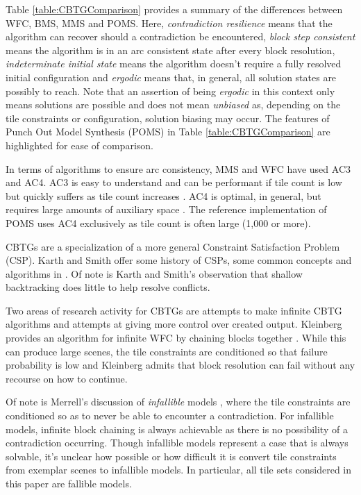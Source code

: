 Table \ref{table:CBTGComparison} provides a summary of the differences between WFC, BMS, MMS and POMS.
Here, \textit{contradiction resilience} means that the algorithm can recover should a contradiction be encountered,
\textit{block step consistent} means the algorithm is in an arc consistent state after every block resolution,
\textit{indeterminate initial state} means the algorithm doesn't require a fully resolved initial configuration and
\textit{ergodic} means that, in general, all solution states are possibly to reach.
Note that an assertion of being \textit{ergodic} in this context only means solutions
are possible and does not mean \textit{unbiased} as, depending on the tile constraints or configuration,
solution biasing may occur.
The features of Punch Out Model Synthesis (POMS) in Table \ref{table:CBTGComparison} are highlighted for ease of comparison.

In terms of algorithms to ensure arc consistency, MMS and WFC have used AC3 and AC4.
AC3 is easy to understand and can be performant if tile count is low but quickly suffers as tile count increases \cite{Wallace1993WhyAI}.
AC4 is optimal, in general, but requires large amounts of auxiliary space \cite{Mohr_Henderson_1986}.
The reference implementation of POMS uses AC4 exclusively as tile count is often large (1,000 or more).


CBTGs are a specialization of a more general Constraint Satisfaction Problem (CSP).
Karth and Smith offer some history of CSPs, some common concepts and algorithms in \cite{Karth_Smith_2017, Karth_Smith_2022}.
Of note is Karth and Smith's observation that shallow backtracking does little to help resolve conflicts.


Two areas of research activity for CBTGs are attempts to make infinite CBTG algorithms
and attempts at giving more control over created output.
Kleinberg provides an algorithm for infinite WFC by chaining blocks together \cite{Kleinberg_2019}.
While this can produce large scenes, the tile constraints are conditioned so that failure probability is low and Kleinberg admits
that block resolution can fail without any recourse on how to continue.

Of note is Merrell's discussion of \textit{infallible} models \cite{Merrell_2009}, where the tile constraints are
conditioned so as to never be able to encounter a contradiction.
For infallible models, infinite block chaining is always achievable as there is no possibility of a contradiction occurring.
Though infallible models represent a case that is always solvable,
it's unclear how possible or how difficult it is convert tile constraints from exemplar scenes to infallible models.
In particular, all tile sets considered in this paper are fallible models.

